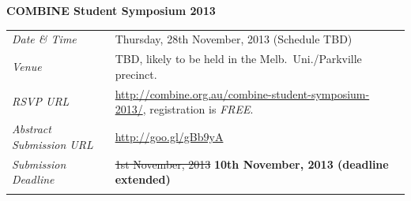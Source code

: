 \documentclass[12pt,]{article}
\author{}
\date{}
\begin{document}
\newpage
\null
\vfill

\begin{minipage}[c]{\columnwidth}
    \centering
    \fontsize{35}{2ex}\selectfont\bfseries COMBINE Student Symposium 2013
\end{minipage}

\begin{longtable}[c]{@{}ll@{}}
\hline\noalign{\medskip}

\noalign{\medskip}
\begin{minipage}[t]{0.30\columnwidth}\raggedright
    \emph{Date \& Time}
    \end{minipage} & \begin{minipage}[t]{0.70\columnwidth}\raggedright
    Thursday, 28th November, 2013 (Schedule TBD)
    \end{minipage}
\\\noalign{\medskip}
\begin{minipage}[t]{0.30\columnwidth}\raggedright
\emph{Venue}
\end{minipage} & \begin{minipage}[t]{0.70\columnwidth}\raggedright
TBD, likely to be held in the Melb.~Uni./Parkville precinct.
\end{minipage}
\\\noalign{\medskip}
\begin{minipage}[t]{0.30\columnwidth}\raggedright
\emph{RSVP URL}
\end{minipage} & \begin{minipage}[t]{0.70\columnwidth}\raggedright
\href{http://combine.org.au/combine-student-symposium-2013/}{http://combine.org.au/combine-student-symposium-2013/}, registration is
\emph{FREE}.
\end{minipage}
\\\noalign{\medskip}
\begin{minipage}[t]{0.30\columnwidth}\raggedright
\emph{Abstract Submission URL}
\end{minipage} & \begin{minipage}[t]{0.70\columnwidth}\raggedright
    \href{http://goo.gl/gBb9yA}{http://goo.gl/gBb9yA}
\end{minipage}
\\\noalign{\medskip}

\begin{minipage}[t]{0.30\columnwidth}\raggedright
\emph{Submission Deadline}
\end{minipage} & \begin{minipage}[t]{0.70\columnwidth}\raggedright
    \st{1st November, 2013} \bfseries 10th November, 2013 (deadline extended)
\end{minipage}
\\\noalign{\medskip}


\end{longtable}
\end{document}
